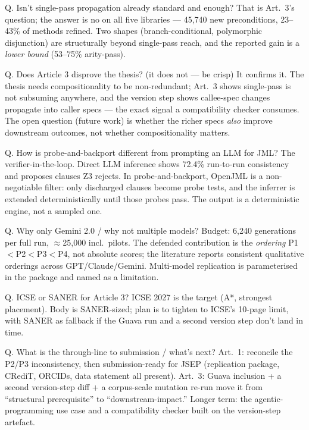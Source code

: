 \documentclass[11pt]{article}
\begin{document}
\begin{qbox}{Q. Isn't single-pass propagation already standard and enough?}
That is Art.~3's question; the answer is no on all five libraries --- 45{,}740
new preconditions, 23--43\% of methods refined. Two shapes (branch-conditional,
polymorphic disjunction) are structurally beyond single-pass reach, and the
reported gain is a \emph{lower bound} (53--75\% arity-pass).
\end{qbox}

\begin{qbox}{Q. Does Article 3 disprove the thesis? (it does not --- be crisp)}
It confirms it. The thesis needs compositionality to be non-redundant; Art.~3
shows single-pass is not subsuming anywhere, and the version step shows
callee-spec changes propagate into caller specs --- the exact signal a
compatibility checker consumes. The open question (future work) is whether the
richer specs \emph{also} improve downstream outcomes, not whether
compositionality matters.
\end{qbox}

\begin{qbox}{Q. How is probe-and-backport different from prompting an LLM for JML?}
The verifier-in-the-loop. Direct LLM inference shows 72.4\% run-to-run
consistency and proposes clauses Z3 rejects. In probe-and-backport, OpenJML is
a non-negotiable filter: only discharged clauses become probe tests, and the
inferrer is extended deterministically until those probes pass. The output is a
deterministic engine, not a sampled one.
\end{qbox}

\begin{qbox}{Q. Why only Gemini 2.0 / why not multiple models?}
Budget: 6{,}240 generations per full run, $\approx$25{,}000 incl.\ pilots. The
defended contribution is the \emph{ordering} P1$<$P2$<$P3$<$P4, not absolute
scores; the literature reports consistent qualitative orderings across
GPT/Claude/Gemini. Multi-model replication is parameterised in the package and
named as a limitation.
\end{qbox}

\begin{qbox}{Q. ICSE or SANER for Article 3?}
ICSE 2027 is the target (A*, strongest placement). Body is SANER-sized; plan is
to tighten to ICSE's 10-page limit, with SANER as fallback if the Guava run
and a second version step don't land in time.
\end{qbox}

\begin{qbox}{Q. What is the through-line to submission / what's next?}
Art.~1: reconcile the P2/P3 inconsistency, then submission-ready for JSEP
(replication package, CRediT, ORCIDs, data statement all present). Art.~3:
Guava inclusion + a second version-step diff + a corpus-scale mutation re-run
move it from ``structural prerequisite'' to ``downstream-impact.'' Longer term:
the agentic-programming use case and a compatibility checker built on the
version-step artefact.
\end{qbox}
\end{document}
